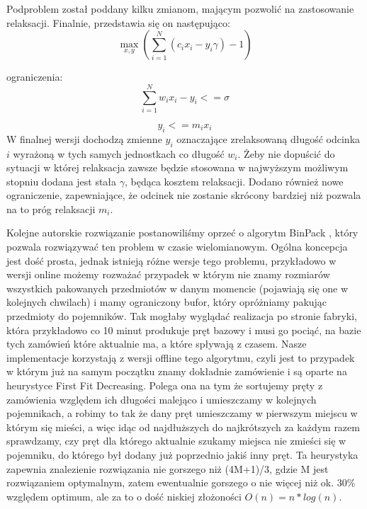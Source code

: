 Podproblem został poddany kilku zmianom, mającym pozwolić na zastosowanie relaksacji. Finalnie, przedstawia się on następująco:
\begin{equation}
    \max_{x,y} (\sum_{i=1}^{N} (c_i x_i - y_i \gamma) - 1)
\end{equation}

ograniczenia:
\begin{equation}
    \sum_{i=1}^{N} w_i x_i - y_i <= \sigma
\label{ograniczenie1}
\end{equation}

\begin{equation}
    y_i <= m_i x_i
\label{ograniczenie2}
\end{equation}
W finalnej wersji dochodzą zmienne \(y_i\) oznaczające zrelaksowaną długość odcinka \(i\) wyrażoną w tych samych jednostkach co długość \(w_i\). Żeby nie dopuścić do sytuacji w której relaksacja zawsze będzie stosowana w najwyższym możliwym stopniu dodana jest stała \(\gamma\), będąca kosztem relaksacji. Dodano również nowe ograniczenie, zapewniające, że odcinek nie zostanie skrócony bardziej niż pozwala na to próg relaksacji \(m_i\).

Kolejne autorskie rozwiązanie postanowiliśmy oprzeć o algorytm BinPack \cite{bin-packing}, który pozwala rozwiązywać ten problem w czasie wielomianowym. Ogólna koncepcja jest dość prosta, jednak istnieją różne wersje tego problemu, przykładowo w wersji online możemy rozważać przypadek w którym nie znamy rozmiarów wszystkich pakowanych przedmiotów w danym momencie (pojawiają się one w kolejnych chwilach) i mamy ograniczony bufor, który opróżniamy pakując przedmioty do pojemników. Tak mogłaby wyglądać realizacja po stronie fabryki, która przykładowo co 10 minut produkuje pręt bazowy i musi go pociąć, na bazie tych zamówień które aktualnie ma, a które spływają z czasem. Nasze implementacje korzystają z wersji offline tego algorytmu, czyli jest to przypadek w którym już na samym początku znamy dokładnie zamówienie i są oparte na heurystyce First Fit Decreasing. Polega ona na tym że sortujemy pręty z zamówienia względem ich długości malejąco i umieszczamy w kolejnych pojemnikach, a robimy to tak że dany pręt umieszczamy w pierwszym miejscu w którym się mieści, a więc idąc od najdłuższych do najkrótszych za każdym razem sprawdzamy, czy pręt dla którego aktualnie szukamy miejsca nie zmieści się w pojemniku, do którego był dodany już poprzednio jakiś inny pręt. Ta heurystyka zapewnia znalezienie rozwiązania nie gorszego niż (4M+1)/3, gdzie M jest rozwiązaniem optymalnym, zatem ewentualnie gorszego o nie więcej niż ok. 30\% względem optimum, ale za to o dość niskiej złożoności $O(n) = n * log(n)$.


